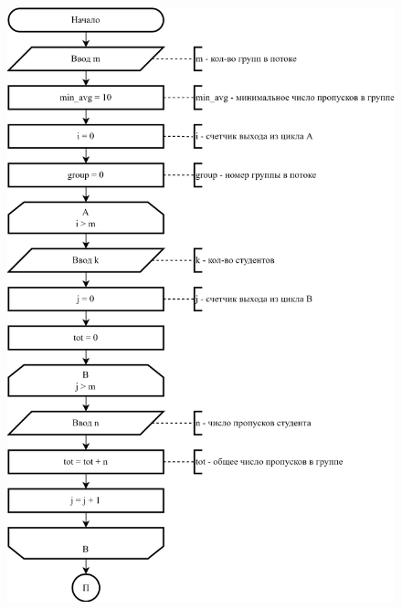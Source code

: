 \documentclass[oneside,a4paper,14pt]{extarticle}
\begin{document}
\begin{figure}
	\centering
	\includegraphics[height=\textheight]{img/10-scheme-p1.png} %
\end{figure}
\end{document}
